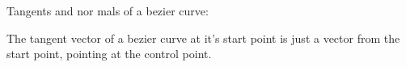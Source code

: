 \documentclass{article}
\begin{document}
\begin{Maple Normal}{
\begin{Maple Normal}{
}\end{Maple Normal}
}\end{Maple Normal}
\begin{Maple Normal}{
\begin{Maple Normal}{
}\end{Maple Normal}
}\end{Maple Normal}
\begin{Maple Normal}{
\begin{Maple Normal}{
Tangents and nor
mals of a bezier curve:}\end{Maple Normal}

}\end{Maple Normal}

\begin{Maple Normal}{
\begin{Maple Normal}{
}\end{Maple Normal}
}\end{Maple Normal}
\begin{Maple Normal}{
\begin{Maple Normal}{
The tangent vector of a bezier curve at it's start point is just a vector from the start point, pointing at the control point.}\end{Maple Normal}

}\end{Maple Normal}
\end{document}

